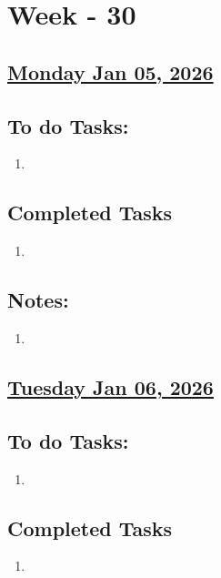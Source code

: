 \section{Week - 30}

\subsection*{\underline{Monday Jan 05, 2026}}
\subsection*{To do Tasks:}
\begin{enumerate}
    \item 
\end{enumerate}
\subsection*{Completed Tasks}
\begin{enumerate}[\ding{52}]  %
    \item 
\end{enumerate}
\subsection*{Notes:}
\begin{enumerate}
    \item 
\end{enumerate}
\subsection*{\underline{Tuesday Jan 06, 2026}}
\subsection*{To do Tasks:}
\begin{enumerate}
    \item  
\end{enumerate}
\subsection*{Completed Tasks}
\begin{enumerate}[\ding{52}]  %
    \item 
\end{enumerate}
